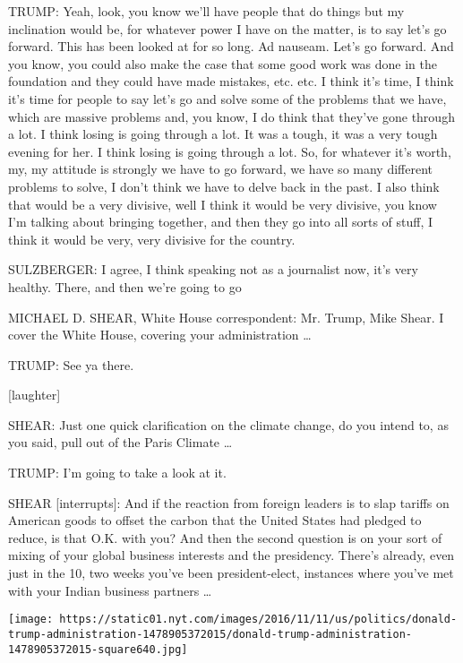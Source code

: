 TRUMP: Yeah, look, you know we'll have people that do things but my
inclination would be, for whatever power I have on the matter, is to say
let's go forward. This has been looked at for so long. Ad nauseam. Let's
go forward. And you know, you could also make the case that some good
work was done in the foundation and they could have made mistakes, etc.
etc. I think it's time, I think it's time for people to say let's go and
solve some of the problems that we have, which are massive problems and,
you know, I do think that they've gone through a lot. I think losing is
going through a lot. It was a tough, it was a very tough evening for
her. I think losing is going through a lot. So, for whatever it's worth,
my, my attitude is strongly we have to go forward, we have so many
different problems to solve, I don't think we have to delve back in the
past. I also think that would be a very divisive, well I think it would
be very divisive, you know I'm talking about bringing together, and then
they go into all sorts of stuff, I think it would be very, very divisive
for the country.

SULZBERGER: I agree, I think speaking not as a journalist now, it's very
healthy. There, and then we're going to go

MICHAEL D. SHEAR, White House correspondent: Mr. Trump, Mike Shear. I
cover the White House, covering your administration \ldots{}

TRUMP: See ya there.

{[}laughter{]}

SHEAR: Just one quick clarification on the climate change, do you intend
to, as you said, pull out of the Paris Climate \ldots{}

TRUMP: I'm going to take a look at it.

SHEAR {[}interrupts{]}: And if the reaction from foreign leaders is to
slap tariffs on American goods to offset the carbon that the United
States had pledged to reduce, is that O.K. with you? And then the second
question is on your sort of mixing of your global business interests and
the presidency. There's already, even just in the 10, two weeks you've
been president-elect, instances where you've met with your Indian
business partners \ldots{}

\href{https://www.nytimes.com/interactive/2016/us/politics/donald-trump-administration.html}{}

\texttt{[image: https://static01.nyt.com/images/2016/11/11/us/politics/donald-trump-administration-1478905372015/donald-trump-administration-1478905372015-square640.jpg]}


